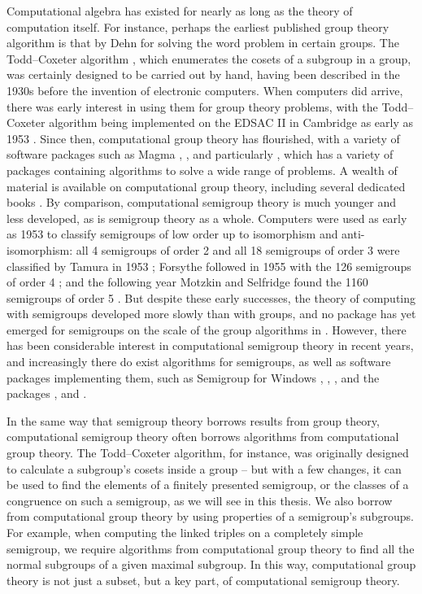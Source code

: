 Computational algebra has existed for nearly as long as the theory of
computation itself.  For instance, perhaps the earliest published group theory
algorithm is that by Dehn \cite{dehn_1911} for solving the word problem in
certain groups.  The Todd--Coxeter algorithm \cite{todd_coxeter_1936}, which
enumerates the cosets of a subgroup in a group, was certainly designed to be
carried out by hand, having been described in the 1930s before the invention of
electronic computers.  When computers did arrive, there was early interest in
using them for group theory problems, with the Todd--Coxeter algorithm being implemented on
the EDSAC II in Cambridge as early as 1953 \cite{leech_1963}.  Since then,
computational group theory has flourished, with a variety of software packages
such as \textsf{Magma} \cite{magma}, \ACE{} \cite{ace}, and particularly \GAP{}
\cite{gap}, which has a variety of packages containing algorithms to solve a
wide range of problems.  A wealth of material is available on computational
group theory, including several dedicated books \cite{sims, cgt}.  By
comparison, computational semigroup theory is much younger and less developed,
as is semigroup theory as a whole.  Computers were used as early as 1953 to
classify semigroups of low order up to isomorphism and anti-isomorphism: all 4
semigroups of order 2 and all 18 semigroups of order 3 were classified by Tamura
in 1953 \cite{tamura_1953}; Forsythe followed in 1955 with the 126 semigroups of
order 4 \cite{order_4}; and the following year Motzkin and Selfridge found the
1160 semigroups of order 5 \cite{order_5, jurgensen_1977}.  But despite these
early successes, the theory of computing with semigroups developed more slowly
than with groups, and no package has yet emerged for semigroups on the scale of
the group algorithms in \GAP{}.  However, there has been considerable interest
in computational semigroup theory in recent years, and increasingly there do
exist algorithms for semigroups, as well as software packages implementing them,
such as \textsf{Semigroup for Windows} \cite{sgpwin}, \Semigroupe{}
\cite{semigroupe}, \libsemigroups{} \cite{libsemigroups}, and the \GAP{}
packages \Semigroups{} \cite{semigroups}, \smallsemi{} \cite{smallsemi} and
\kbmag{} \cite{kbmag}.

In the same way that semigroup theory borrows results from group theory,
computational semigroup theory often borrows algorithms from computational group
theory.  The Todd--Coxeter algorithm, for instance, was originally designed to
calculate a subgroup's cosets inside a group -- but with a few changes, it can
be used to find the elements of a finitely presented semigroup, or the classes
of a congruence on such a semigroup, as we will see in this thesis.  We also
borrow from computational group theory by using properties of a semigroup's
subgroups.  For example, when computing the linked triples on a completely
simple semigroup, we require algorithms from computational group theory to find
all the normal subgroups of a given maximal subgroup.  In this way,
computational group theory is not just a subset, but a key part, of
computational semigroup theory.

